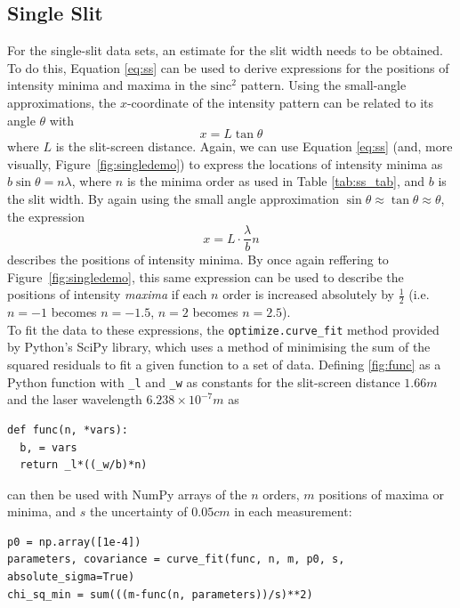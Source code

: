 \documentclass[a4paper]{article}
\begin{document}
\subsection{Single Slit} \label{sec:ssan}

For the single-slit data sets, an estimate for the slit width needs to be obtained. To do this, Equation \ref{eq:ss} can be used to derive expressions for the positions of intensity minima and maxima in the $\text{sinc}^2$ pattern. Using the small-angle approximations, the $x$-coordinate of the intensity pattern can be related to its angle $\theta$ with 
\begin{equation} \label{eq:xcoord}
x=L\tan\theta
\end{equation}
where $L$ is the slit-screen distance. Again, we can use Equation \ref{eq:ss} (and, more visually, Figure~\ref{fig:singledemo}) to express the locations of intensity minima as $b\sin\theta=n\lambda$, where $n$ is the minima order as used in Table \ref{tab:ss_tab}, and $b$ is the slit width. By again using the small angle approximation $\sin\theta\approx\tan\theta\approx\theta$, the expression 
\begin{equation} \label{fig:func}
x=L\cdot\frac\lambda{b}n
\end{equation} describes the positions of intensity minima. By once again reffering to Figure~\ref{fig:singledemo}, this same expression can be used to describe the positions of intensity {\it maxima} if each $n$ order is increased absolutely by $\frac12$ (i.e. $n=-1$ becomes $n=-1.5$, $n=2$ becomes $n=2.5$).\\
To fit the data to these expressions, the \lstinline$optimize.curve_fit$ method provided by Python's SciPy library, which uses a method of minimising the sum of the squared residuals to fit a given function to a set of data. Defining \ref{fig:func} as a Python function with \lstinline$_l$ and \lstinline$_w$ as constants for the slit-screen distance $1.66m$ and the laser wavelength $6.238\times10^{-7} m$ as
\begin{lstlisting}[belowskip=-1.5 \baselineskip]
def func(n, *vars):
  b, = vars
  return _l*((_w/b)*n)
\end{lstlisting}
can then be used with NumPy arrays of the $n$ orders, $m$ positions of maxima or minima, and $s$ the uncertainty of $0.05cm$ in each measurement:
\begin{lstlisting}[belowskip=-1.5 \baselineskip]
p0 = np.array([1e-4])
parameters, covariance = curve_fit(func, n, m, p0, s, absolute_sigma=True)
chi_sq_min = sum(((m-func(n, parameters))/s)**2)
\end{lstlisting} 
\end{document}
